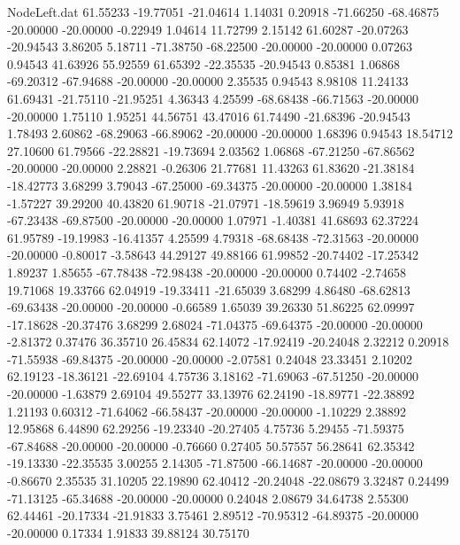 \begin{filecontents}{NodeLeft.dat}
  61.55233  -19.77051  -21.04614     1.14031    0.20918  -71.66250  -68.46875  -20.00000  -20.00000   -0.22949    1.04614   11.72799    2.15142
  61.60287  -20.07263  -20.94543     3.86205    5.18711  -71.38750  -68.22500  -20.00000  -20.00000    0.07263    0.94543   41.63926   55.92559
  61.65392  -22.35535  -20.94543     0.85381    1.06868  -69.20312  -67.94688  -20.00000  -20.00000    2.35535    0.94543    8.98108   11.24133
  61.69431  -21.75110  -21.95251     4.36343    4.25599  -68.68438  -66.71563  -20.00000  -20.00000    1.75110    1.95251   44.56751   43.47016
  61.74490  -21.68396  -20.94543     1.78493    2.60862  -68.29063  -66.89062  -20.00000  -20.00000    1.68396    0.94543   18.54712   27.10600
  61.79566  -22.28821  -19.73694     2.03562    1.06868  -67.21250  -67.86562  -20.00000  -20.00000    2.28821   -0.26306   21.77681   11.43263
  61.83620  -21.38184  -18.42773     3.68299    3.79043  -67.25000  -69.34375  -20.00000  -20.00000    1.38184   -1.57227   39.29200   40.43820
  61.90718  -21.07971  -18.59619     3.96949    5.93918  -67.23438  -69.87500  -20.00000  -20.00000    1.07971   -1.40381   41.68693   62.37224
  61.95789  -19.19983  -16.41357     4.25599    4.79318  -68.68438  -72.31563  -20.00000  -20.00000   -0.80017   -3.58643   44.29127   49.88166
  61.99852  -20.74402  -17.25342     1.89237    1.85655  -67.78438  -72.98438  -20.00000  -20.00000    0.74402   -2.74658   19.71068   19.33766
  62.04919  -19.33411  -21.65039     3.68299    4.86480  -68.62813  -69.63438  -20.00000  -20.00000   -0.66589    1.65039   39.26330   51.86225
  62.09997  -17.18628  -20.37476     3.68299    2.68024  -71.04375  -69.64375  -20.00000  -20.00000   -2.81372    0.37476   36.35710   26.45834
  62.14072  -17.92419  -20.24048     2.32212    0.20918  -71.55938  -69.84375  -20.00000  -20.00000   -2.07581    0.24048   23.33451    2.10202
  62.19123  -18.36121  -22.69104     4.75736    3.18162  -71.69063  -67.51250  -20.00000  -20.00000   -1.63879    2.69104   49.55277   33.13976
  62.24190  -18.89771  -22.38892     1.21193    0.60312  -71.64062  -66.58437  -20.00000  -20.00000   -1.10229    2.38892   12.95868    6.44890
  62.29256  -19.23340  -20.27405     4.75736    5.29455  -71.59375  -67.84688  -20.00000  -20.00000   -0.76660    0.27405   50.57557   56.28641
  62.35342  -19.13330  -22.35535     3.00255    2.14305  -71.87500  -66.14687  -20.00000  -20.00000   -0.86670    2.35535   31.10205   22.19890
  62.40412  -20.24048  -22.08679     3.32487    0.24499  -71.13125  -65.34688  -20.00000  -20.00000    0.24048    2.08679   34.64738    2.55300
  62.44461  -20.17334  -21.91833     3.75461    2.89512  -70.95312  -64.89375  -20.00000  -20.00000    0.17334    1.91833   39.88124   30.75170

\end{filecontents}
